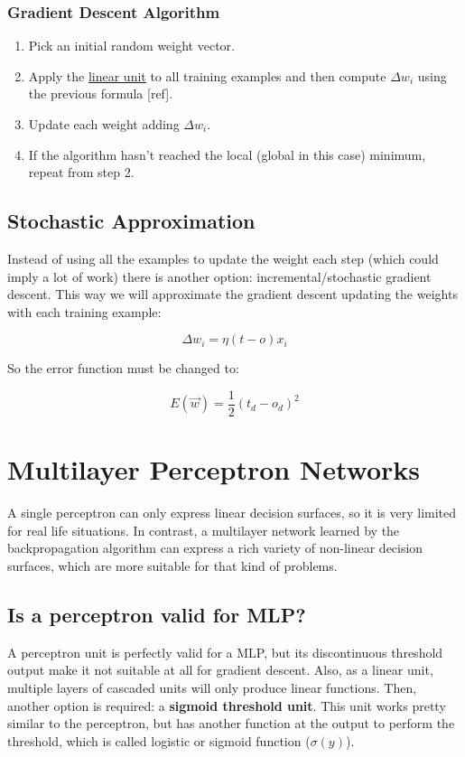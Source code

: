 \documentclass{article}
\begin{document}
	\subsubsection{Gradient Descent Algorithm}

	\begin{enumerate}

		\item Pick an initial random weight vector.
		\item Apply the \hyperref[linear_unit]{linear unit} to all training examples and then compute $\Delta w_i$  using the previous formula [ref].
		\item Update each weight adding $\Delta w_i$.
		\item If the algorithm hasn’t reached the local (global in this case) minimum, repeat from step 2.
	
	\end{enumerate}

	\subsection{Stochastic Approximation}
	Instead of using all the examples to update the weight each step (which could imply a lot of work) there is another option: incremental/stochastic gradient descent. This way we will approximate the gradient descent updating the weights with each training example:

	\begin{equation}
		\label{delta_rule}
		\Delta w_{i}= \eta (t - o) x_{i}
	\end{equation}

	So the error function must be changed to:

	\begin{equation}
		\label{error_function_stoc_square}
		E(\vec{w}) = \frac{1}{2} (t_d-o_d)^2 
	\end{equation}

\section{Multilayer Perceptron Networks}
A single perceptron can only express linear decision surfaces, so it is very limited for real life situations.  In contrast, a multilayer network learned by the backpropagation algorithm can express a rich variety of non-linear decision surfaces, which are more suitable for that kind of problems.

	\subsection{Is a perceptron valid for MLP?}
	A perceptron unit is perfectly valid for a MLP, but its discontinuous threshold output make it not suitable at all for gradient descent. Also, as a linear unit, multiple layers of cascaded units will only produce linear functions. Then, another option is required: a \textbf{sigmoid threshold unit}. This unit works pretty similar to the perceptron, but has another function at the output to perform the threshold, which is called logistic or sigmoid function ($\sigma(y)$).
\end{document}
